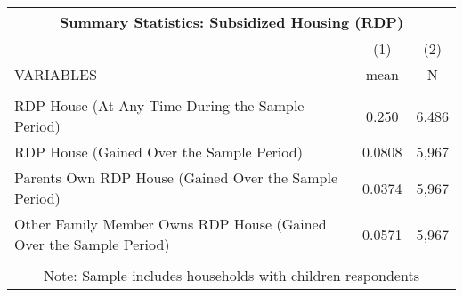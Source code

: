 \begin{tabular}{lcc}
\multicolumn{3}{c}{Summary Statistics: Subsidized Housing (RDP)} \\ \hline
 & (1) & (2) \\
VARIABLES & mean & N \\ \hline
 &  &  \\
RDP House (At Any Time During the Sample Period) & 0.250 & 6,486 \\
RDP House (Gained Over the Sample Period) & 0.0808 & 5,967 \\
Parents Own RDP House (Gained Over the Sample Period) & 0.0374 & 5,967 \\
Other Family Member Owns RDP House (Gained Over the Sample Period) & 0.0571 & 5,967 \\
 &  &  \\ \hline
\multicolumn{3}{c}{ Note: Sample includes households with children respondents} \\
\end{tabular}

